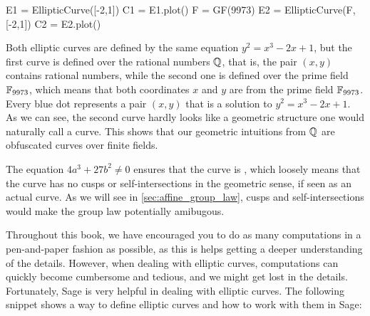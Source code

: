 \medskip

\begin{sagesilent}
E1 = EllipticCurve([-2,1])
C1 = E1.plot()
F = GF(9973)
E2 = EllipticCurve(F, [-2,1])
C2 = E2.plot()
\end{sagesilent}
\begin{minipage}{0.48\textwidth}
\end{minipage}
%
\begin{minipage}{0.48\textwidth}
\label{plot:elliptic_curve}
\end{minipage}

Both elliptic curves are defined by the same  equation $y^2 = x^3-2x+1$, but the first curve is defined over the rational numbers $\mathbb{Q}$, that is, the pair $(x,y)$ contains rational numbers, while the second one is defined over the prime field $\mathbb{F}_{9973}$, which means that both coordinates $x$ and $y$ are from the prime field $\mathbb{F}_{9973}$. Every blue dot represents a pair $(x,y)$ that is a solution to $y^2 = x^3-2x+1$. As we can see, the second curve hardly looks like a geometric structure one would naturally call a curve. This shows that our geometric intuitions from $\mathbb{Q}$ are obfuscated curves over finite fields.

The equation $4a^3+ 27b^2\neq 0$ ensures that the curve is  , which loosely means that the curve has no cusps or self-intersections in the geometric sense, if seen as an actual curve. As we will see in \ref{sec:affine_group_law}, cusps and self-intersections would make the group law potentially amibugous.

Throughout this book, we have encouraged you to do as many computations in a pen-and-paper fashion as possible, as this is helps getting a deeper understanding of the details. However, when dealing with elliptic curves, computations can quickly become cumbersome and tedious, and we might get lost in the details. Fortunately, Sage is very helpful in dealing with elliptic curves. The following snippet shows a way to define elliptic curves and how to work with them in Sage:

